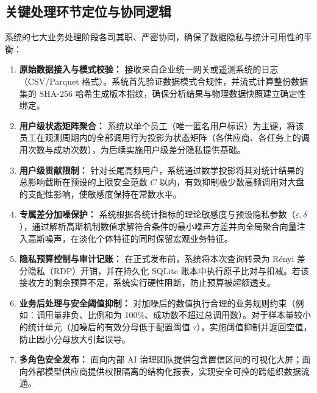 \subsection{关键处理环节定位与协同逻辑}
系统的七大业务处理阶段各司其职、严密协同，确保了数据隐私与统计可用性的平衡：

\begin{enumerate}[label=\textbf{\arabic*.}, leftmargin=2em]
  \item \textbf{原始数据接入与模式校验：} 接收来自企业统一网关或遥测系统的日志（CSV/Parquet 格式）。系统首先验证数据模式合规性，并流式计算整份数据集的 SHA-256 哈希生成版本指纹，确保分析结果与物理数据快照建立确定性绑定。
  \item \textbf{用户级状态矩阵聚合：} 系统以单个员工（唯一匿名用户标识）为主键，将该员工在观测周期内的全部调用行为投影为状态矩阵（各供应商、各任务上的调用次数与成功次数），为后续实施用户级差分隐私提供基础。
  \item \textbf{用户级贡献限制：} 针对长尾高频用户，系统通过数学投影将其对统计结果的总影响截断在预设的上限安全范数 $C$ 以内，有效抑制极少数高频调用对大盘的支配性影响，使敏感度保持在常数水平。
  \item \textbf{专属差分加噪保护：} 系统根据各统计指标的理论敏感度与预设隐私参数（$\varepsilon, \delta$），通过解析高斯机制数值求解符合条件的最小噪声方差并向全局聚合向量注入高斯噪声，在淡化个体特征的同时保留宏观业务特征。
  \item \textbf{隐私预算控制与审计记账：} 在正式发布前，系统将本次查询转录为 Rényi 差分隐私（RDP）开销，并在持久化 SQLite 账本中执行原子比对与扣减。若该接收方的剩余预算不足，系统实行硬性阻断，防止预算被超额透支。
  \item \textbf{业务后处理与安全阈值抑制：} 对加噪后的数值执行合理的业务规则约束（例如：调用量非负、比例和为 100\%、成功数不超过总调用数）。对于样本量较小的统计单元（加噪后的有效分母低于配置阈值 $\tau$），实施阈值抑制并返回空值，防止因小分母放大引起误导。
  \item \textbf{多角色安全发布：} 面向内部 AI 治理团队提供包含置信区间的可视化大屏；面向外部模型供应商提供权限隔离的结构化报表，实现安全可控的跨组织数据流通。
\end{enumerate}
